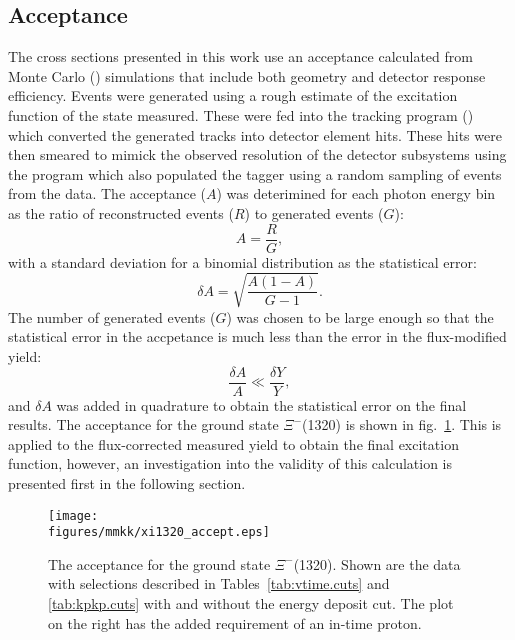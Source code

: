 \subsection{\label{sec:results.xi1320.accept}Acceptance}

The cross sections presented in this work use an acceptance calculated from Monte Carlo (\label{abbr:mc}) simulations that include both geometry and detector response efficiency. Events were generated using a rough estimate of the excitation function of the state measured. These were fed into the tracking program (\label{abbr:gsim}) which converted the generated tracks into detector element hits. These hits were then smeared to mimick the observed resolution of the detector subsystems using the program \label{abbr:gpp} which also populated the tagger using a random sampling of events from the data. The acceptance ($A$) was deterimined for each photon energy bin as the ratio of reconstructed events ($R$) to generated events ($G$):
\begin{equation}
    A = \frac{R}{G},
\end{equation}
with a standard deviation for a binomial distribution as the statistical error:
\begin{equation}
    \delta A = \sqrt{\frac{A (1 - A)}{G - 1}}.
    \label{eqn:accept.err}
\end{equation}
The number of generated events ($G$) was chosen to be large enough so that the statistical error in the accpetance is much less than the error in the flux-modified yield:
\begin{equation}
    \frac{\delta A}{A} \ll \frac{\delta Y}{Y},
\end{equation}
and $\delta A$ was added in quadrature to obtain the statistical error on the final results. The acceptance for the ground state $\Xi^-$(1320) is shown in fig.~\ref{fig:xi1320.accept}. This is applied to the flux-corrected measured yield to obtain the final excitation function, however, an investigation into the validity of this calculation is presented first in the following section.

\begin{figure}[bhp]\centering
    \texttt{[image: \\figures/mmkk/xi1320\_accept.eps]}
    \caption[\texorpdfstring{$\Xi^-$}{Xi-}(1320) Acceptance]{\label{fig:xi1320.accept}The acceptance for the ground state $\Xi^-$(1320). Shown are the data with selections described in Tables~\ref{tab:vtime.cuts} and \ref{tab:kpkp.cuts} with and without the  energy deposit cut. The plot on the right has the added requirement of an in-time proton.}
\end{figure}

